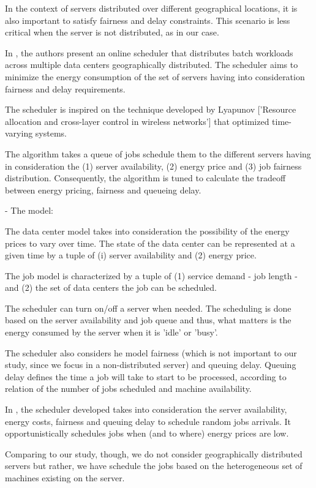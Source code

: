In the context of servers distributed over different geographical locations, it
is also important to satisfy fairness and delay constraints. This scenario is
less critical when the server is not distributed, as in our case.

In \cite{EFF_JOB_SCHEDULING}, the authors present an online scheduler that
distributes batch workloads across multiple data centers geographically
distributed. The scheduler aims to minimize the energy consumption of the set of
servers having into consideration fairness and delay requirements.   

The scheduler is inspired on the technique developed by Lyapunov ['Resource
allocation and cross-layer control in wireless networks'] that
optimized time-varying systems. 

The algorithm takes a queue of jobs schedule them to the different servers
having in consideration the (1) server availability, (2) energy price and (3)
job fairness distribution. Consequently, the algorithm is tuned to calculate the
tradeoff between energy pricing, fairness and queueing delay.

- The model:

The data center model takes into consideration the possibility of the energy
prices to vary over time. The state of the data center can be represented at a
given time by a tuple of (i) server availability and (2) energy price.

The job model is characterized by a tuple of (1) service demand - job length -
and (2) the set of data centers the job can be scheduled. 

The scheduler can turn on/off a server when needed. The scheduling is done based
on the server availability and job queue and thus, what matters is the energy
consumed by the server when it is 'idle' or 'busy'.

The scheduler also considers he model fairness (which is not important to
our study, since we focus in a non-distributed server) and queuing delay.
Queuing delay defines the time a job will take to start to be processed,
according to relation of the number of jobs scheduled and machine availability.

In \cite{EFF_JOB_SCHEDULING}, the scheduler developed takes into consideration
the server availability, energy costs, fairness and queuing delay to schedule
random jobs arrivals. It opportunistically schedules jobs when (and to where) 
energy prices are low.

Comparing to our study, though, we do not consider geographically distributed 
servers but rather, we have schedule the jobs based on the heterogeneous set of 
machines existing on the server.



